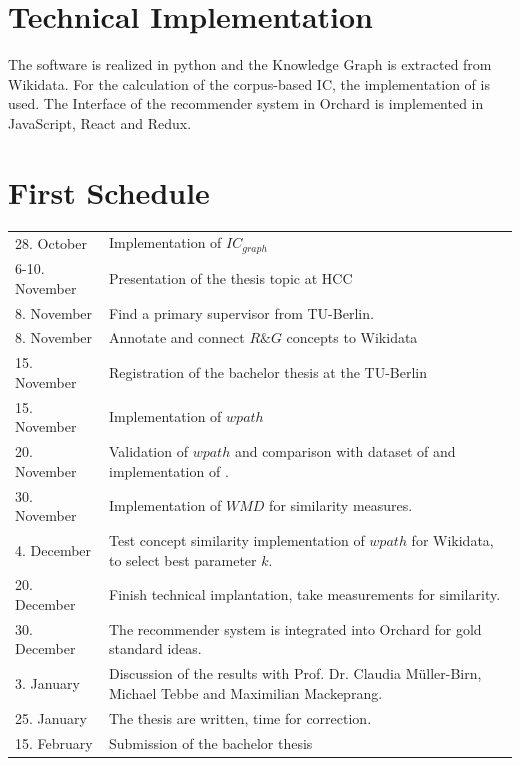 \documentclass[pdftex,a4paper,12pt]{scrartcl}
\theoremstyle{definition}
\begin{document}
    
    

\section{Technical Implementation}
    
    The software is realized in python and  the Knowledge Graph is extracted from Wikidata.
    For the calculation of the corpus-based IC, the implementation of \citet{zhu_computing_2017} is used. 
    The Interface of the recommender system in Orchard is implemented in JavaScript, React and Redux.  
    

\section{First Schedule}
\renewcommand{\arraystretch}{1.5}
\begin{tabularx}{\textwidth}{lX}
28. October & Implementation of $IC_{graph}$\\
6-10. November & Presentation of the thesis topic at HCC\\
8. November & Find a primary supervisor from TU-Berlin.\\
8. November & Annotate and connect $R\&G$ concepts to Wikidata\\
15. November & Registration of the bachelor thesis at the TU-Berlin \\
15. November & Implementation of $wpath$\\
20. November & Validation of $wpath$ and comparison with dataset of \citet{rubenstein_contextual_1965} and implementation of \citet{zhu_computing_2017}.\\
30. November & Implementation of $WMD$ for similarity measures. \\
4. December & Test concept similarity implementation of $wpath$ for Wikidata, to select best parameter $k$. \\
20. December & Finish technical implantation, take measurements for similarity.\\
30. December & The recommender system is integrated into Orchard for gold standard ideas. \\
3. January & Discussion of the results with Prof. Dr. Claudia Müller-Birn, Michael Tebbe and Maximilian Mackeprang.\\
25. January & The thesis are written, time for correction.\\
15. February & Submission of the bachelor thesis\\
\end{tabularx}
\end{document}
